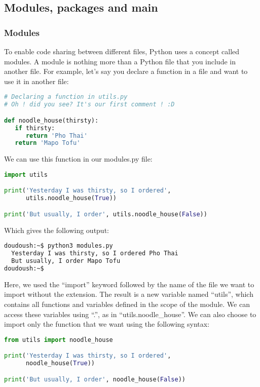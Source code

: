 \subsection{Modules, packages and main}
\subsubsection{Modules}
To enable code sharing between different files, Python uses a concept called modules. A module
is nothing more than a Python file that you include in another file. For example, let's say
you declare a function in a file and want to use it in another file:

\begin{lstlisting}[language=python]
# Declaring a function in utils.py
# Oh ! did you see? It's our first comment ! :D

def noodle_house(thirsty):
   if thirsty:
      return 'Pho Thai'
   return 'Mapo Tofu'
\end{lstlisting}

We can use this function in our modules.py file:

\begin{lstlisting}[language=python]
import utils

print('Yesterday I was thirsty, so I ordered',
      utils.noodle_house(True))

print('But usually, I order', utils.noodle_house(False))
\end{lstlisting}

Which gives the following output:

\begin{lstlisting}[language=bash]
doudoush:~$ python3 modules.py
  Yesterday I was thirsty, so I ordered Pho Thai
  But usually, I order Mapo Tofu
doudoush:~$
\end{lstlisting}

Here, we used the ``import'' keyword followed by the name of the file we want to import
without the extension. The result is a new variable named ``utils'', which contains all functions
and variables defined in the scope of the module. We can access these variables
using ``.'', as in ``utils.noodle\_house''. We can also choose to import only the function
that we want using the following syntax:

\begin{lstlisting}[language=python]
from utils import noodle_house

print('Yesterday I was thirsty, so I ordered',
      noodle_house(True))

print('But usually, I order', noodle_house(False))
\end{lstlisting}


